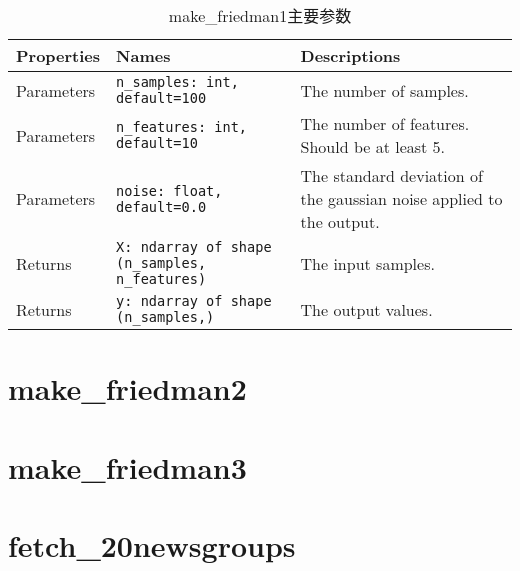 \begin{table}[H]
    \centering
    \caption{make\_friedman1主要参数}
    \begin{tabularx}{\textwidth}{llX}
        \hline
        Properties & Names                                              & Descriptions                                                        \\
        \hline
        Parameters & \verb|n_samples: int, default=100|                 & The number of samples.                                              \\
        Parameters & \verb|n_features: int, default=10|                 & The number of features. Should be at least 5.                       \\
        Parameters & \verb|noise: float, default=0.0|                   & The standard deviation of the gaussian noise applied to the output. \\
        Returns    & \verb|X: ndarray of shape (n_samples, n_features)| & The input samples.                                                  \\
        Returns    & \verb|y: ndarray of shape (n_samples,)|            & The output values.                                                  \\
        \hline
    \end{tabularx}
\end{table}
\section{make\_friedman2\label{makefriedman2}}
\section{make\_friedman3\label{makefriedman3}}
\section{fetch\_20newsgroups\label{fetch20newsgroups}}